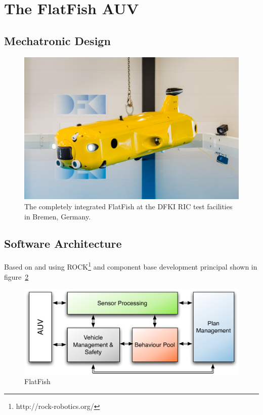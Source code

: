 \documentclass[conference]{IEEEtran}
\begin{document}
\section{The FlatFish AUV}

\subsection{Mechatronic Design}


\begin{figure}[!t]
	\centering
	\includegraphics[width=0.9\columnwidth]{FlatFish-1.jpg}
	\caption{The completely integrated FlatFish at the DFKI RIC test facilities in Bremen, Germany.}
	\label{fig:flatfish1}
\end{figure}


\subsection{Software Architecture}

Based on \cite{albiez2010} and \cite{meinecke2013} using ROCK\footnote{http://rock-robotics.org/} and component base development \cite{Joyeux2011} principal shown in figure~\ref{fig:sw_arch}

\begin{figure}[!t]
	\centering
	\includegraphics[width=0.9\columnwidth]{sw_arch_overview}
	\caption{FlatFish}
	\label{fig:sw_arch}
\end{figure}
\end{document}
